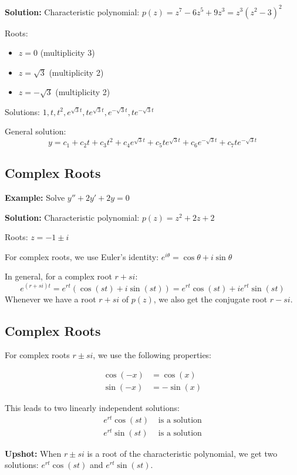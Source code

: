 \documentclass{article}
\begin{document}
\textbf{Solution:} 
Characteristic polynomial: $p(z) = z^7 - 6z^5 + 9z^3 = z^3(z^2-3)^2$

Roots:
\begin{itemize}
    \item $z = 0$ (multiplicity 3)
    \item $z = \sqrt{3}$ (multiplicity 2)
    \item $z = -\sqrt{3}$ (multiplicity 2)
\end{itemize}

Solutions: $1, t, t^2, e^{\sqrt{3}t}, te^{\sqrt{3}t}, e^{-\sqrt{3}t}, te^{-\sqrt{3}t}$

General solution:
\[
y = c_1 + c_2t + c_3t^2 + c_4e^{\sqrt{3}t} + c_5te^{\sqrt{3}t} + c_6e^{-\sqrt{3}t} + c_7te^{-\sqrt{3}t}
\]

\subsection*{Complex Roots}

\textbf{Example:} Solve $y'' + 2y' + 2y = 0$

\textbf{Solution:} 
Characteristic polynomial: $p(z) = z^2 + 2z + 2$

Roots: $z = -1 \pm i$

For complex roots, we use Euler's identity: $e^{i\theta} = \cos\theta + i\sin\theta$

In general, for a complex root $r + si$:
\[
e^{(r+si)t} = e^{rt}(\cos(st) + i\sin(st)) = e^{rt}\cos(st) + ie^{rt}\sin(st)
\]
Whenever we have a root $r + si$ of $p(z)$, we also get the conjugate root $r - si$.
\subsection*{Complex Roots}

For complex roots $r \pm si$, we use the following properties:

\begin{align*}
\cos(-x) &= \cos(x) \\
\sin(-x) &= -\sin(x)
\end{align*}

This leads to two linearly independent solutions:
\begin{align*}
e^{rt}\cos(st) &\text{ is a solution} \\
e^{rt}\sin(st) &\text{ is a solution}
\end{align*}

\textbf{Upshot:} When $r \pm si$ is a root of the characteristic polynomial, we get two solutions: $e^{rt}\cos(st)$ and $e^{rt}\sin(st)$.
\end{document}
